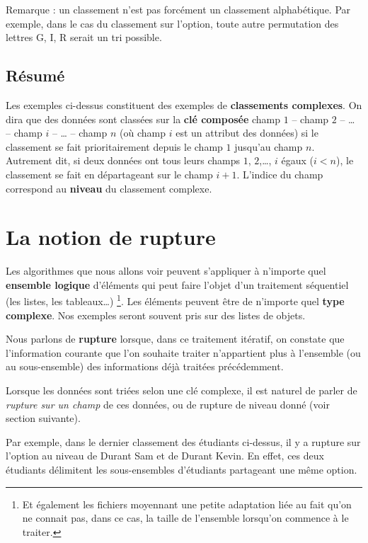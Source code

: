 	Remarque : un classement n’est pas forcément un classement alphabétique.
        Par exemple, dans le cas du classement sur l'option, toute autre
        permutation des lettres G, I, R serait un tri possible.

\subsection*{Résumé}
	Les exemples ci-dessus constituent des exemples de \textbf{classements complexes}. 
	On dira que des données sont classées sur la \textbf{clé composée} 
	champ $1$ – champ $2$ – \dots{} – champ $i$ – \dots{} – champ $n$ 
	(où \og{}champ $i$\fg{} est un attribut des données) 
	si le classement se fait prioritairement depuis le champ $1$ jusqu’au champ $n$. 
	Autrement dit, si deux données ont tous leurs champs $1$, $2$,\dots, $i$ égaux ($i<n$), 
	le classement se fait en départageant sur le champ $i+1$. 
	L’indice du champ correspond au \textbf{niveau} du classement complexe.

\section{La notion de rupture}

	Les algorithmes que nous allons voir 
	peuvent s'appliquer à n'importe quel \textbf{ensemble logique} d'éléments
	qui peut faire l'objet d'un traitement séquentiel
	(les listes, les tableaux\dots)%
	\footnote{%
		Et également les fichiers moyennant une petite adaptation
		liée au fait qu'on ne connait pas, dans ce cas, 
		la taille de l'ensemble lorsqu'on commence à le traiter.
	}. 
	Les éléments peuvent être de n'importe quel \textbf{type complexe}.
	Nos exemples seront souvent pris sur des listes de objets. 
		
	Nous parlons de \textbf{rupture} lorsque, dans ce traitement itératif, 
	on constate que l’information courante que l’on souhaite traiter
	n’appartient plus à l’ensemble (ou au sous-ensemble) 
	des informations déjà traitées précédemment.
	
	Lorsque les données sont triées selon une clé complexe, il est naturel
        de parler de \textit{rupture sur un champ} de ces données, ou de rupture
        de niveau donné (voir section suivante).
	
	Par exemple, dans le dernier classement des étudiants ci-dessus, il y a
	rupture sur l’option au niveau de Durant Sam et de Durant Kevin. En
	effet, ces deux étudiants délimitent les sous-ensembles d’étudiants
	partageant une même option.
		

